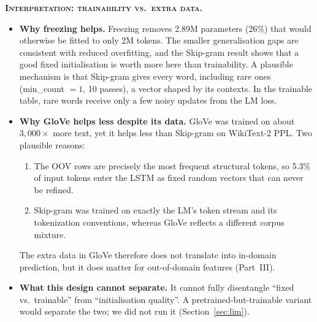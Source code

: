 \documentclass[10pt,a4paper]{article}
\newcommand{\obs}[1]{\textsc{\textbf{#1}}}
\begin{document}
\obs{Interpretation: trainability vs.\ extra data.}
\begin{itemize}
\item \textbf{Why freezing helps.} Freezing removes 2.89M parameters (26\%) that would otherwise be fitted to only 2M tokens. The smaller generalisation gaps are consistent with reduced overfitting, and the Skip-gram result shows that a good fixed initialisation is worth more here than trainability. A plausible mechanism is that Skip-gram gives every word, including rare ones (min\_count $=1$, 10 passes), a vector shaped by its contexts. In the trainable table, rare words receive only a few noisy updates from the LM loss.
\item \textbf{Why GloVe helps less despite its data.} GloVe was trained on about $3{,}000\times$ more text, yet it helps less than Skip-gram on WikiText-2 PPL. Two plausible reasons:
  \begin{enumerate}
  \item The OOV rows are precisely the most frequent structural tokens, so 5.3\% of input tokens enter the LSTM as fixed random vectors that can never be refined.
  \item Skip-gram was trained on exactly the LM's token stream and its tokenization conventions, whereas GloVe reflects a different corpus mixture.
  \end{enumerate}
  The extra data in GloVe therefore does not translate into in-domain prediction, but it does matter for out-of-domain features (Part~III).
\item \textbf{What this design cannot separate.} It cannot fully disentangle ``fixed vs.\ trainable'' from ``initialisation quality''. A pretrained-but-trainable variant would separate the two; we did not run it (Section~\ref{sec:lim}).
\end{itemize}

\end{document}
